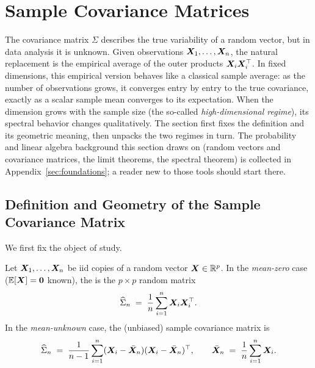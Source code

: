 
\section{Sample Covariance Matrices}\label{sec:scm}


The covariance matrix \(\Sigma\) describes the true variability of a random vector, but in data analysis it is unknown. Given observations \(\bm{X}_1, \ldots, \bm{X}_n\), the natural replacement is the empirical average of the outer products \(\bm{X}_i \bm{X}_i^{\top}\). In fixed dimensions, this empirical version behaves like a classical sample average: as the number of observations grows, it converges entry by entry to the true covariance, exactly as a scalar sample mean converges to its expectation. When the dimension grows with the sample size (the so-called \emph{high-dimensional regime}), its spectral behavior changes qualitatively. The section first fixes the definition and its geometric meaning, then unpacks the two regimes in turn. The probability and linear algebra background this section draws on (random vectors and covariance matrices, the limit theorems, the spectral theorem) is collected in Appendix~\ref{sec:foundations}; a reader new to those tools should start there.

\subsection{Definition and Geometry of the Sample Covariance Matrix}\label{subsec:scm-foundations}

We first fix the object of study.

\begin{definition}\label{def:scm}
Let \(\bm{X}_1, \ldots, \bm{X}_n\) be iid copies of a random vector \(\bm{X} \in \mathbb{R}^p\). In the \emph{mean-zero} case (\(\mathbb{E}[\bm{X}] = \bm{0}\) known), the  is the \(p \times p\) random matrix
\begin{equation}
  \widehat{\Sigma}_n \;=\; \frac{1}{n} \sum_{i = 1}^n \bm{X}_i \bm{X}_i^{\top}.
  \label{eq:scm-outer}
\end{equation}
In the \emph{mean-unknown} case, the (unbiased) sample covariance matrix is
\[
  \widehat{\Sigma}_n \;=\; \frac{1}{n - 1} \sum_{i = 1}^n (\bm{X}_i - \bar{\bm{X}}_n)(\bm{X}_i - \bar{\bm{X}}_n)^{\top}, \qquad \bar{\bm{X}}_n \;=\; \frac{1}{n} \sum_{i = 1}^n \bm{X}_i.
\]
\end{definition}


